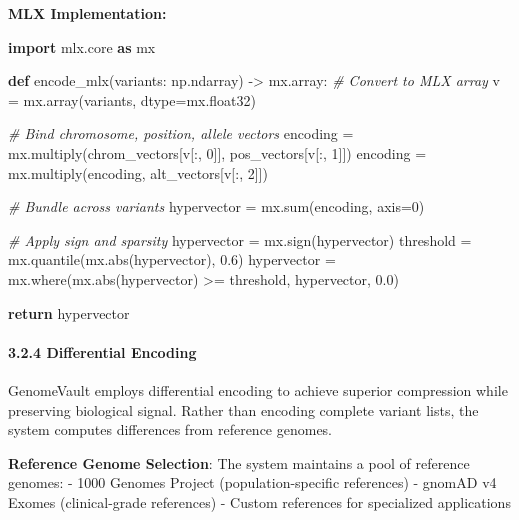 \documentclass[
  11pt,
]{article}
\newenvironment{Shaded}{}{}
\newcommand{\BuiltInTok}[1]{\textcolor[rgb]{0.00,0.50,0.00}{#1}}
\newcommand{\CommentTok}[1]{\textcolor[rgb]{0.38,0.63,0.69}{\textit{#1}}}
\newcommand{\ControlFlowTok}[1]{\textcolor[rgb]{0.00,0.44,0.13}{\textbf{#1}}}
\newcommand{\DecValTok}[1]{\textcolor[rgb]{0.25,0.63,0.44}{#1}}
\newcommand{\FloatTok}[1]{\textcolor[rgb]{0.25,0.63,0.44}{#1}}
\newcommand{\ImportTok}[1]{\textcolor[rgb]{0.00,0.50,0.00}{\textbf{#1}}}
\newcommand{\KeywordTok}[1]{\textcolor[rgb]{0.00,0.44,0.13}{\textbf{#1}}}
\newcommand{\NormalTok}[1]{#1}
\newcommand{\OperatorTok}[1]{\textcolor[rgb]{0.40,0.40,0.40}{#1}}
\begin{document}
\textbf{MLX Implementation:}

\begin{Shaded}
\begin{Highlighting}[]
\ImportTok{import}\NormalTok{ mlx.core }\ImportTok{as}\NormalTok{ mx}

\KeywordTok{def}\NormalTok{ encode\_mlx(variants: np.ndarray) }\OperatorTok{{-}\textgreater{}}\NormalTok{ mx.array:}
    \CommentTok{\# Convert to MLX array}
\NormalTok{    v }\OperatorTok{=}\NormalTok{ mx.array(variants, dtype}\OperatorTok{=}\NormalTok{mx.float32)}

    \CommentTok{\# Bind chromosome, position, allele vectors}
\NormalTok{    encoding }\OperatorTok{=}\NormalTok{ mx.multiply(chrom\_vectors[v[:, }\DecValTok{0}\NormalTok{]],}
\NormalTok{                          pos\_vectors[v[:, }\DecValTok{1}\NormalTok{]])}
\NormalTok{    encoding }\OperatorTok{=}\NormalTok{ mx.multiply(encoding, alt\_vectors[v[:, }\DecValTok{2}\NormalTok{]])}

    \CommentTok{\# Bundle across variants}
\NormalTok{    hypervector }\OperatorTok{=}\NormalTok{ mx.}\BuiltInTok{sum}\NormalTok{(encoding, axis}\OperatorTok{=}\DecValTok{0}\NormalTok{)}

    \CommentTok{\# Apply sign and sparsity}
\NormalTok{    hypervector }\OperatorTok{=}\NormalTok{ mx.sign(hypervector)}
\NormalTok{    threshold }\OperatorTok{=}\NormalTok{ mx.quantile(mx.}\BuiltInTok{abs}\NormalTok{(hypervector), }\FloatTok{0.6}\NormalTok{)}
\NormalTok{    hypervector }\OperatorTok{=}\NormalTok{ mx.where(mx.}\BuiltInTok{abs}\NormalTok{(hypervector) }\OperatorTok{\textgreater{}=}\NormalTok{ threshold,}
\NormalTok{                          hypervector, }\FloatTok{0.0}\NormalTok{)}

    \ControlFlowTok{return}\NormalTok{ hypervector}
\end{Highlighting}
\end{Shaded}

\paragraph{3.2.4 Differential Encoding}\label{differential-encoding}

GenomeVault employs differential encoding to achieve superior
compression while preserving biological signal. Rather than encoding
complete variant lists, the system computes differences from reference
genomes.

\textbf{Reference Genome Selection}: The system maintains a pool of
reference genomes: - 1000 Genomes Project (population-specific
references) - gnomAD v4 Exomes (clinical-grade references) - Custom
references for specialized applications
\end{document}
